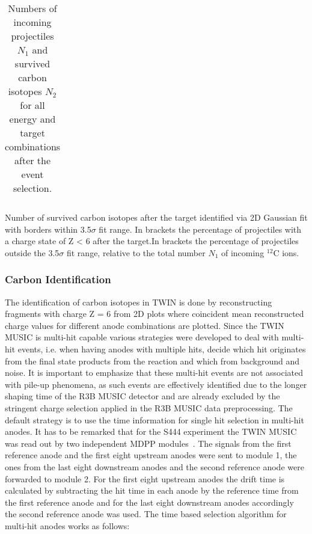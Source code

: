 \begin{table}[h!]
\begin{subtable}[c]{1.\textwidth}
\begin{tabular}{|c|c|c|c|c|}
\hline
\end{tabular}
\caption{Number of survived carbon isotopes after the target identified via 2D Gaussian fit with borders within 3.5$\sigma$ fit range. In brackets the percentage of projectiles with a charge state of Z < 6 after the target.In brackets the percentage of projectiles outside the 3.5$\sigma$ fit range, relative to the total number $N_1$ of incoming $^{12}$C ions.}
\label{tab:survived_ions}
\end{subtable}
\caption{Numbers of incoming projectiles $N_1$ and survived carbon isotopes $N_2$ for all energy and target combinations after the event selection.}
\label{tab:overview_nr_cccs}
\end{table}
\subsubsection{Carbon Identification}\label{subsec:carbon_id}
The identification of carbon isotopes in TWIN is done by reconstructing fragments with charge Z = 6 from 2D plots where coincident mean reconstructed charge values for different anode combinations are plotted. Since the TWIN MUSIC is multi-hit capable various strategies were developed to deal with multi-hit events, i.e. when having anodes with multiple hits, decide which hit originates from the final state products from the reaction and which from background and noise. It is important to emphasize that these multi-hit events are not associated with pile-up phenomena, as such events are effectively identified due to the longer shaping time of the R3B MUSIC detector and are already excluded by the stringent charge selection applied in the R3B MUSIC data preprocessing.\newline
The default strategy is to use the time information for single hit selection in multi-hit anodes. It has to be remarked that for the S444 experiment the TWIN MUSIC was read out by two independent MDPP modules~\cite{MDPP-16}. The signals from the first reference anode and the first eight upstream anodes were sent to module 1, the ones from the last eight downstream anodes and the second reference anode were forwarded to module 2. For the first eight upstream anodes the drift time is calculated by subtracting the hit time in each anode by the reference time from the first reference anode and for the last eight downstream anodes accordingly the second reference anode was used.\newline
The time based selection algorithm for multi-hit anodes works as follows:\newline
